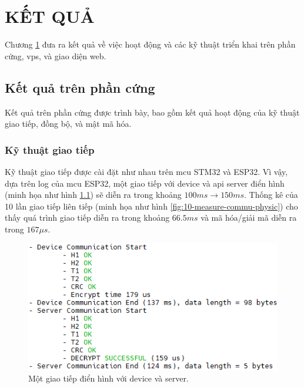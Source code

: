 \chapter{KẾT QUẢ}
\label{Chapter4}

Chương \ref{Chapter4} đưa ra kết quả về việc hoạt động và các kỹ thuật triển khai trên phần cứng, \acrshort{vps}, và giao diện web.

\section{Kết quả trên phần cứng}

Kết quả trên phần cứng được trình bày, bao gồm kết quả hoạt động của kỹ thuật giao tiếp, đồng bộ, và mật mã hóa.

\subsection{Kỹ thuật giao tiếp}

Kỹ thuật giao tiếp được cài đặt như nhau trên \acrshort{mcu} STM32 và ESP32. Vì vậy, dựa trên log của \acrshort{mcu} ESP32, một giao tiếp với device và \acrfull{api} server điển hình (minh họa như hình \ref{fig:communication-of-device-server}) sẽ diễn ra trong khoảng $100ms\rightarrow 150ms$. Thống kê của 10 lần giao tiếp liên tiếp (minh họa như hình \ref{fig:10-measure-commu-physic}) cho thấy quá trình giao tiếp diễn ra trong khoảng $66.5ms$ và mã hóa/giải mã diễn ra trong $167\mu s$.

\begin{figure}[htp]
\centering
\includegraphics[width=1.0\linewidth]{images/fig-communication-of-device-server.png}
\caption{Một giao tiếp điển hình với device và server.}
\label{fig:communication-of-device-server}
\end{figure}

